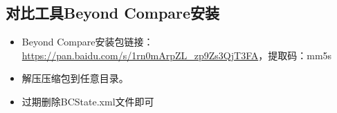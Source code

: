 \subsection{对比工具Beyond Compare安装}
\begin{itemize}
\item Beyond Compare安装包链接：\url{https://pan.baidu.com/s/1rn0mArpZL_zp9Zs3QjT3FA}，提取码：mm5s
\item 解压压缩包到任意目录。
\item 过期删除BCState.xml文件即可
\end{itemize}

